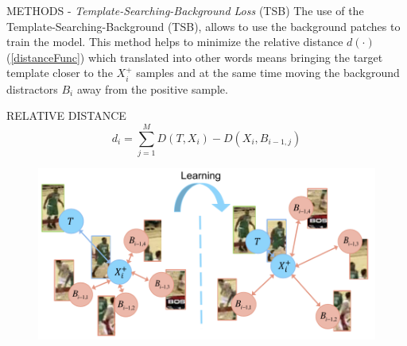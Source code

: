 \begin{frame}{METHODS - \emph{Template-Searching-Background Loss} (TSB)}
    The use of the Template-Searching-Background (TSB), allows to use the 
    background patches to train the model. This method helps to minimize 
    the relative distance $d(\cdot)$ (\ref{distanceFunc}) which translated into other words means 
    bringing the target template closer to the $X_i^+$ samples and at the same 
    time moving the background distractors $B_i$ away from the positive 
    sample.
    \begin{minipage}{\linewidth}
        \centering
        \begin{minipage}{0.45\linewidth}
            \begin{block}{RELATIVE DISTANCE}
                \begin{equation}\label{distanceFunc}
                    d_i=\sum^M_{j=1} D(T, X_i) - D(X_i, B_{i-1,j})
                \end{equation}
            \end{block}  
        \end{minipage}
        \hspace{0.05\linewidth}
        \begin{minipage}{0.47\linewidth}
            \begin{figure}[h!]
                \centering
                \includegraphics[width =\linewidth]{images/paper8/TSB.png}
                \centering
            \end{figure}
        \end{minipage}
    \end{minipage}
\end{frame}

